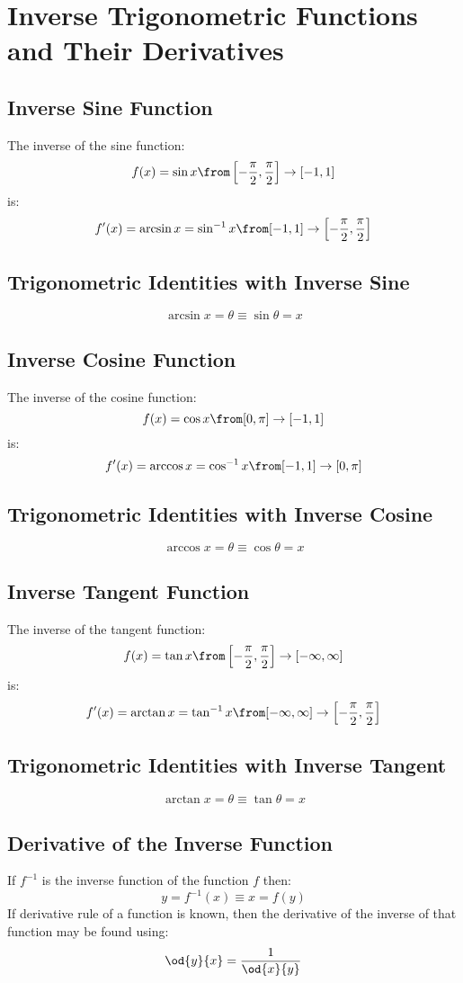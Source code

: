 \section{Inverse Trigonometric Functions and Their Derivatives}
\subsection{Inverse Sine Function}
	The inverse of the sine function:
	\[f(x) = \sin x \from \left[ -\frac{\pi}{2}, \frac{\pi}{2} \right] \to [-1,1]\]
	is:\
	\[f'(x) = \arcsin x = \sin^{-1} x \from [-1,1] \to \left[ -\frac{\pi}{2}, \frac{\pi}{2} \right]\]
\subsection{Trigonometric Identities with Inverse Sine}
	\[\arcsin x = \theta \equiv \sin \theta = x\]
\subsection{Inverse Cosine Function}
	The inverse of the cosine function:
	\[f(x) = \cos x \from [0, \pi] \to [-1,1]\]
	is:\
	\[f'(x) = \arccos x = \cos^{-1} x \from [-1,1] \to [0,\pi]\]
\subsection{Trigonometric Identities with Inverse Cosine}
	\[\arccos x = \theta \equiv \cos \theta = x\]
\subsection{Inverse Tangent Function}
	The inverse of the tangent function:
	\[f(x) = \tan x \from \left[ -\frac{\pi}{2}, \frac{\pi}{2} \right] \to [-\infty,\infty]\]
	is:\
	\[f'(x) = \arctan x = \tan^{-1} x \from [-\infty,\infty] \to \left[ -\frac{\pi}{2}, \frac{\pi}{2} \right]\]
\subsection{Trigonometric Identities with Inverse Tangent}
	\[\arctan x = \theta \equiv \tan \theta = x\]
\subsection{Derivative of the Inverse Function}
	If $f^{-1}$ is the inverse function of the function $f$ then:
	\[y = f^{-1}(x) \equiv x = f(y)\]
	If derivative rule of a function is known, then the derivative of the inverse of that function may be found using:
	\[\od{y}{x} = \frac{1}{\od{x}{y}}\]
